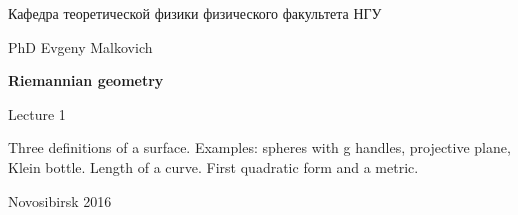 \documentclass[12pt,pagesize,paper=192mm:108mm]{scrbook}
\begin{document}
\begin{titlepage}
\begin{center}
    Кафедра теоретической физики физического факультета НГУ
    \medskip

    \Large
    PhD Evgeny Malkovich

    \huge
    \textbf{Riemannian geometry}
    \smallskip

    \Large
    Lecture 1
    \vfill

    \normalsize
    \begin{minipage}{0.65\linewidth}
      Three definitions of a surface. Examples: spheres with g
      handles, projective plane, Klein bottle. Length of a
      curve. First quadratic form and a metric. 
    \end{minipage}
    \vfill

    \normalsize \ccbysa\hspace{0.5em}  Novosibirsk 2016
  \end{center}
\end{titlepage}
\end{document}
